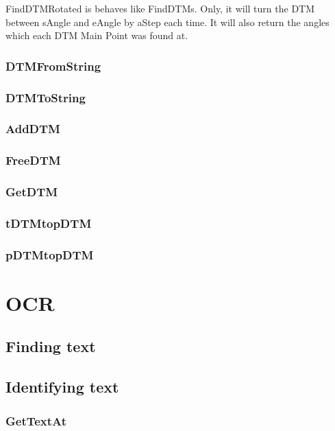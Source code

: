 \documentclass[a4paper]{report}
\begin{document}
FindDTMRotated is behaves like FindDTMs. Only, it will turn the DTM between 
sAngle and eAngle by aStep each time. It will also return the angles which each DTM Main Point 
was found at.

\subsection{DTMFromString}

\subsection{DTMToString}

\subsection{AddDTM}

\subsection{FreeDTM}

\subsection{GetDTM}

\subsection{tDTMtopDTM}

\subsection{pDTMtopDTM}


\chapter{OCR}

\section{Finding text}

\section{Identifying text}

\subsection{GetTextAt}
\end{document}
